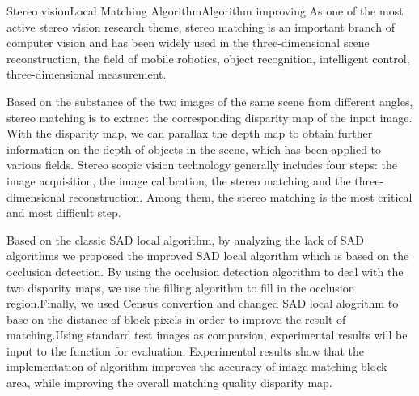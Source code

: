 
\begin{Eabstract}{Stereo vision}{Local Matching Algorithm}{Algorithm improving}{}{}
As  one  of  the  most 
active stereo vision research theme,  stereo  matching  is an important  branch  of  computer  vision  and has been widely used in the three-dimensional 
scene reconstruction, the field of mobile robotics, object recognition, intelligent control, 
three-dimensional measurement. 

Based on the substance of the two images of the same scene from different angles, 
stereo matching is to extract the corresponding disparity map of the input image. With 
the disparity map, we can parallax the depth map to obtain further information on the 
depth  of  objects  in  the  scene,  which  has  been  applied  to  various  fields.  Stereo  scopic 
vision  technology  generally  includes  four  steps:  the  image  acquisition,  the  image 
calibration, the stereo matching and the three-dimensional reconstruction. Among them, 
the  stereo  matching  is  the  most  critical  and  most  difficult  step.  

Based  on  the  classic SAD local  algorithm,  by  analyzing  the  lack  of  SAD 
algorithms we proposed the improved SAD local algorithm which is based on the  
occlusion  detection. By using the occlusion detection algorithm to  deal with the two disparity 
maps, we use the filling algorithm to fill in the occlusion region.Finally, we used Census convertion 
and changed SAD local alogrithm to base on the distance of block pixels in order to improve the result of matching.Using standard test images 
 as comparsion, experimental results will be input to the 
function for evaluation. Experimental results show that the implementation of algorithm improves the 
accuracy of image matching block  area, while improving the overall matching quality 
disparity map. 
\end{Eabstract}

